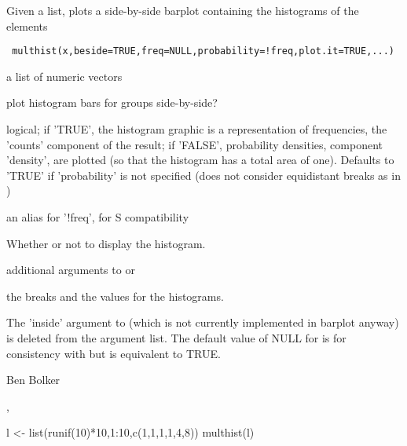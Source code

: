 \begin{Description}\relax
Given a list, plots a side-by-side barplot containing the histograms
of the elements
\end{Description}
\begin{Usage}
\begin{verbatim}
 multhist(x,beside=TRUE,freq=NULL,probability=!freq,plot.it=TRUE,...)
\end{verbatim}
\end{Usage}
\begin{Arguments}
\begin{ldescription}
\item[\code{x}] a list of numeric vectors
\item[\code{beside}] plot histogram bars for groups side-by-side?
\item[\code{freq}] logical; if 'TRUE', the histogram graphic is a representation
of frequencies, the 'counts' component of the result; if
'FALSE', probability densities, component 'density', are
plotted (so that the histogram has a total area of one).
Defaults to 'TRUE' if 'probability' is not specified
(does not consider equidistant breaks as in )
\item[\code{probability}] an alias for '!freq', for S compatibility
\item[\code{plot.it}] Whether or not to display the histogram.
\item[\code{...}] additional arguments to  or 
\end{ldescription}
\end{Arguments}
\begin{Value}
the breaks and the values for the histograms.
\end{Value}
\begin{Note}\relax
The 'inside' argument to  (which is not currently
implemented in barplot anyway) is deleted from the argument list. The
default value of NULL for  is for consistency with 
but is equivalent to TRUE.
\end{Note}
\begin{Author}\relax
Ben Bolker
\end{Author}
\begin{SeeAlso}\relax
{},
\end{SeeAlso}
\begin{Examples}
\begin{ExampleCode}
 l <- list(runif(10)*10,1:10,c(1,1,1,1,4,8))
 multhist(l)
\end{ExampleCode}
\end{Examples}

